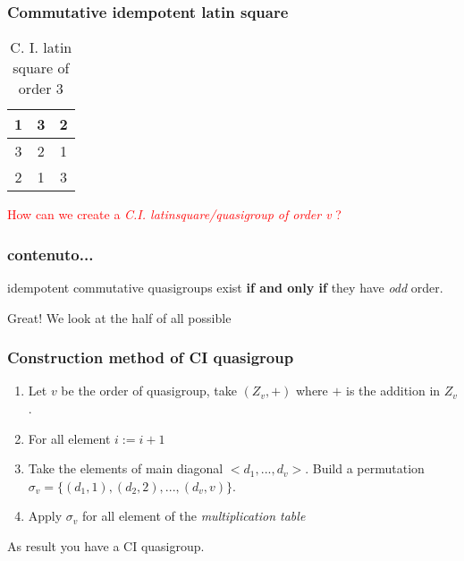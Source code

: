 \begin{frame}
\frametitle{Commutative idempotent latin square}
\begin{center}
	\begin{table}[]
		\begin{tabular}{|c|c|c|}
			\hline
			1 & 3 & 2 \\ \hline
			3 & 2 & 1 \\ \hline
			2 & 1 & 3 \\ \hline
		\end{tabular}
	\caption{C. I. latin square of order $3$}
	\end{table}
\end{center}
\pause
\textcolor{red}{How can we create a \textit{C.I. latinsquare/quasigroup of order v} ?}
\end{frame}

\begin{frame}
\frametitle{contenuto...}
\begin{theorem}%
	idempotent commutative quasigroups exist \textbf{if and only if} they have \textit{odd} order.
\end{theorem}

Great! We look at the half of all possible
\end{frame}

\begin{frame}
\frametitle{Construction method of CI quasigroup}
\begin{enumerate}
	\item Let $v$ be the order of quasigroup, take $(Z_v,+)$ where $+$ is the addition in $Z_v$.
	\item For all element $i := i +1$
	\item Take the elements of main diagonal $<d_1,...,d_v>$. Build a permutation $\sigma_v = \{(d_1,1), (d_2,2),..., (d_v,v)\}$.
	\item Apply $\sigma_v$ for all element of the \textit{multiplication table}
\end{enumerate}
As result you have a CI quasigroup.
\end{frame}

